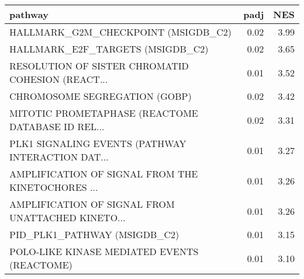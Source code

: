 \begin{tabular}{lrr}
\toprule
                                           pathway &  padj &   NES \\
\midrule
               HALLMARK\_G2M\_CHECKPOINT (MSIGDB\_C2) &  0.02 &  3.99 \\
                  HALLMARK\_E2F\_TARGETS (MSIGDB\_C2) &  0.02 &  3.65 \\
 RESOLUTION OF SISTER CHROMATID COHESION (REACT... &  0.01 &  3.52 \\
                     CHROMOSOME SEGREGATION (GOBP) &  0.02 &  3.42 \\
 MITOTIC PROMETAPHASE (REACTOME DATABASE ID REL... &  0.02 &  3.31 \\
 PLK1 SIGNALING EVENTS (PATHWAY INTERACTION DAT... &  0.01 &  3.27 \\
 AMPLIFICATION OF SIGNAL FROM THE KINETOCHORES ... &  0.01 &  3.26 \\
 AMPLIFICATION OF SIGNAL FROM UNATTACHED KINETO... &  0.01 &  3.26 \\
                      PID\_PLK1\_PATHWAY (MSIGDB\_C2) &  0.01 &  3.15 \\
       POLO-LIKE KINASE MEDIATED EVENTS (REACTOME) &  0.01 &  3.10 \\
\bottomrule
\end{tabular}
